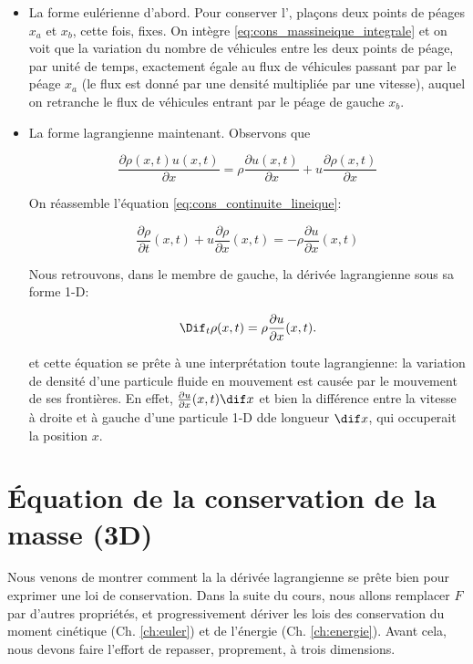 \begin{itemize}
  \item
La forme eulérienne d'abord. Pour conserver l', plaçons deux points de péages $x_a$ et $x_b$, cette fois, fixes. On intègre \eqref{eq:cons_massineique_integrale} et on voit que la variation du nombre de véhicules entre les deux points de péage, par unité de temps,  exactement égale au flux de véhicules passant par par le péage $x_a$ (le flux est donné par une densité multipliée par une vitesse), auquel on retranche le flux de véhicules entrant par le péage de gauche $x_b$. 

\item La forme lagrangienne maintenant. Observons que

\begin{displaymath}
\frac{\partial \rho(x,t) u(x,t)}{\partial x} = 
\rho \frac{\partial u(x,t)}{\partial x} + 
u  \frac{\partial \rho(x,t)}{\partial x} 
\end{displaymath}

On réassemble l'équation \eqref{eq:cons_continuite_lineique}:

\begin{displaymath}
\frac{\partial \rho}{\partial t}(x,t) + 
u  \frac{\partial \rho}{\partial x} (x,t)  =  -
\rho \frac{\partial u}{\partial x}(x,t) 
\end{displaymath}

Nous retrouvons, dans le membre de gauche, la dérivée lagrangienne sous sa forme 1-D:

\begin{displaymath}
\Dif_t \rho (x,t) = \rho \frac{\partial u}{\partial x} (x,t). 
\label{eq:cons_continuite_lineique_lagrange}
\end{displaymath}

et cette équation se prête à une interprétation toute lagrangienne: la variation de densité d'une particule fluide en mouvement est causée par le mouvement de ses frontières. En effet,  $\frac{\partial u}{\partial x}(x,t)\dif x$ et bien la différence entre la vitesse à droite et à gauche d'une particule 1-D dde longueur $\dif x$, qui occuperait la position $x$. 
\end{itemize} 

\section{Équation de la conservation de la masse (3D) \label{sec:masse}}

Nous venons de montrer comment la la dérivée lagrangienne se prête bien pour  exprimer une loi de conservation. Dans la suite du cours, nous allons remplacer $F$ par d'autres propriétés, et progressivement dériver les lois des conservation du moment cinétique (Ch. \ref{ch:euler}) et de l'énergie (Ch. \ref{ch:energie}).  Avant cela, nous devons faire l'effort de repasser, proprement, à trois dimensions. 

